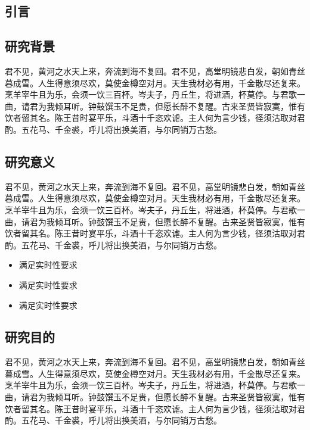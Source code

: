 \documentclass[a4paper, UTF8]{ctexart}
\begin{document}
	\setlength{\columnsep}{0.7cm}\setlength{\columnwidth}{8.45cm}\begin{multicols}{2}
	
	\section{引言}%
	
	\subsection{研究背景}%
	
	君不见，黄河之水天上来，奔流到海不复回。君不见，高堂明镜悲白发，朝如青丝暮成雪。人生得意须尽欢，莫使金樽空对月。天生我材必有用，千金散尽还复来。烹羊宰牛且为乐，会须一饮三百杯。岑夫子，丹丘生，将进酒，杯莫停。与君歌一曲，请君为我倾耳听。钟鼓馔玉不足贵，但愿长醉不复醒。古来圣贤皆寂寞，惟有饮者留其名。陈王昔时宴平乐，斗酒十千恣欢谑。主人何为言少钱，径须沽取对君酌。五花马、千金裘，呼儿将出换美酒，与尔同销万古愁。
	
	\subsection{研究意义}%
	
	君不见，黄河之水天上来，奔流到海不复回。君不见，高堂明镜悲白发，朝如青丝暮成雪。人生得意须尽欢，莫使金樽空对月。天生我材必有用，千金散尽还复来。烹羊宰牛且为乐，会须一饮三百杯。岑夫子，丹丘生，将进酒，杯莫停。与君歌一曲，请君为我倾耳听。钟鼓馔玉不足贵，但愿长醉不复醒。古来圣贤皆寂寞，惟有饮者留其名。陈王昔时宴平乐，斗酒十千恣欢谑。主人何为言少钱，径须沽取对君酌。五花马、千金裘，呼儿将出换美酒，与尔同销万古愁。
	
	\begin{itemize}
		\item 满足实时性要求
		\item 满足实时性要求
		\item 满足实时性要求
	\end{itemize}
	
	\subsection{研究目的}%
	
	君不见，黄河之水天上来，奔流到海不复回。君不见，高堂明镜悲白发，朝如青丝暮成雪。人生得意须尽欢，莫使金樽空对月。天生我材必有用，千金散尽还复来。烹羊宰牛且为乐，会须一饮三百杯。岑夫子，丹丘生，将进酒，杯莫停。与君歌一曲，请君为我倾耳听。钟鼓馔玉不足贵，但愿长醉不复醒。古来圣贤皆寂寞，惟有饮者留其名。陈王昔时宴平乐，斗酒十千恣欢谑。主人何为言少钱，径须沽取对君酌。五花马、千金裘，呼儿将出换美酒，与尔同销万古愁。
	

\end{multicols}
\end{document}
